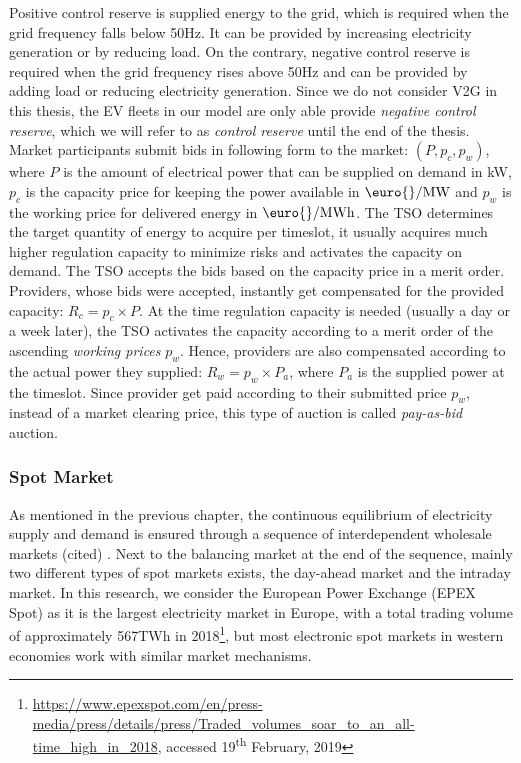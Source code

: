 \documentclass[a4paper, twoside, 12pt]{article}
\let\cite\shortcite
\begin{document}
Positive control reserve is supplied energy to the grid, which is required when
the grid frequency falls below 50Hz. It can be provided by increasing
electricity generation or by reducing load. On the contrary, negative control
reserve is required when the grid frequency rises above 50Hz and can be provided
by adding load or reducing electricity generation. Since we do not consider V2G
in this thesis, the EV fleets in our model are only able provide \emph{negative
control reserve}, which we will refer to as \emph{control reserve} until the end of
the thesis. Market participants submit bids in following form to the market:
\((P, p_c, p_w)\), where \(P\) is the amount of electrical power that can be
supplied on demand in kW, \(p_c\) is the capacity price for keeping the power
available in \(\text{\euro{}/MW}\) and \(p_w\) is the working price for delivered
energy in \(\text{\euro{}/MWh}\). The TSO determines the target quantity of energy
to acquire per timeslot, it usually acquires much higher regulation capacity to
minimize risks and activates the capacity on demand. The TSO accepts the bids
based on the capacity price in a merit order. Providers, whose bids were
accepted, instantly get compensated for the provided capacity: \(R_c = p_c \times
P\). At the time regulation capacity is needed (usually a day or a week later),
the TSO activates the capacity according to a merit order of the ascending
\emph{working prices} \(p_w\). Hence, providers are also compensated according to the
actual power they supplied: \(R_w = p_w \times P_a\), where \(P_a\) is the supplied
power at the timeslot. Since provider get paid according to their submitted
price \(p_w\), instead of a market clearing price, this type of auction is called
\emph{pay-as-bid} auction.
\subsubsection{Spot Market}
\label{sec:orga370364}
As mentioned in the previous chapter, the continuous equilibrium of electricity
supply and demand is ensured through a sequence of interdependent wholesale
markets (cited) \cite{pape16_are_fundam_enoug}. Next to the balancing market at
the end of the sequence, mainly two different types of spot markets exists, the
day-ahead market and the intraday market. In this research, we consider the
European Power Exchange (EPEX Spot) as it is the largest electricity market in Europe,
with a total trading volume of approximately 567TWh in 2018\footnote{\url{https://www.epexspot.com/en/press-media/press/details/press/Traded\_volumes\_soar\_to\_an\_all-time\_high\_in\_2018},
accessed 19\textsuperscript{th} February, 2019\label{orgc80eb6a}}, but most
electronic spot markets in western economies work with similar market mechanisms.
\end{document}
